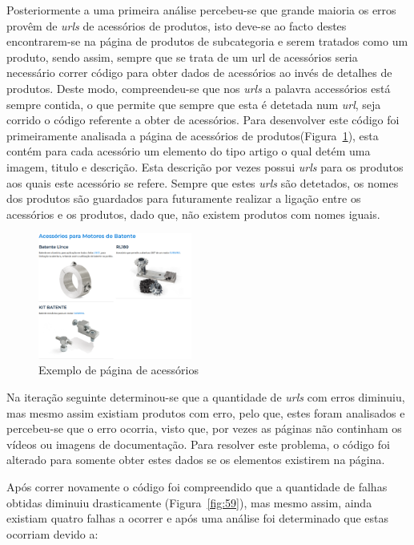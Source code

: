 Posteriormente a uma primeira análise percebeu-se que grande maioria os erros provêm de \textit{urls} de acessórios de produtos, isto deve-se ao facto destes encontrarem-se na página de produtos de subcategoria e serem tratados como um produto, sendo assim, sempre que se trata de um url de acessórios seria necessário correr código para obter dados de acessórios ao invés de detalhes de produtos. Deste modo, compreendeu-se que nos \textit{urls} a palavra accessórios está sempre contida, o que permite que sempre que esta é detetada num \textit{url}, seja corrido o código referente a obter de acessórios. Para desenvolver este código foi primeiramente analisada a página de acessórios de produtos(Figura~\ref*{fig:58}), esta contém para cada acessório um elemento do tipo artigo o qual detém uma imagem, titulo e descrição. Esta descrição por vezes possui \textit{urls} para os produtos aos quais este acessório se refere. Sempre que estes \textit{urls} são detetados, os nomes dos produtos são guardados para futuramente realizar a ligação entre os acessórios e os produtos, dado que, não existem produtos com nomes iguais. 

\begin{figure}[htb]
    \centering
    
    \includegraphics[width=0.45\textwidth]{images/implementacao/scraper/pagina_acessorios.png}
    \caption{Exemplo de página de acessórios}
    \label{fig:58}
\end{figure}

\newpage

Na iteração seguinte determinou-se que a quantidade de \textit{urls} com erros diminuiu, mas mesmo assim existiam produtos com erro, pelo que, estes foram analisados e percebeu-se que o erro ocorria, visto que, por vezes as páginas não continham os vídeos ou imagens de documentação. Para resolver este problema, o código foi alterado para somente obter estes dados se os elementos existirem na página. 

Após correr novamente o código foi compreendido que a quantidade de falhas obtidas diminuiu drasticamente (Figura~\ref{fig:59}), mas mesmo assim, ainda existiam quatro falhas a ocorrer e após uma análise foi determinado que estas ocorriam devido a:

